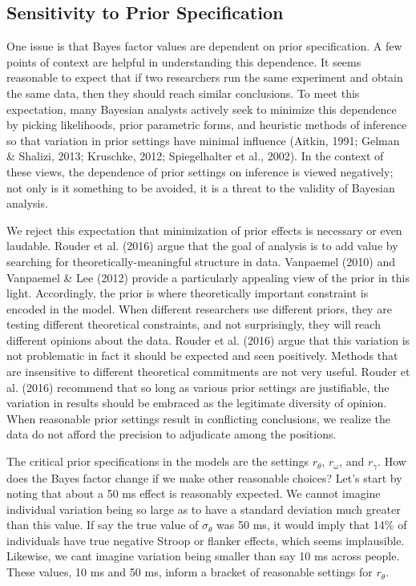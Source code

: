 \documentclass[english,man]{apa6}
\theoremstyle{definition}
\theoremstyle{definition}
\theoremstyle{remark}
\begin{document}
\subsection{Sensitivity to Prior
Specification}\label{sensitivity-to-prior-specification}

One issue is that Bayes factor values are dependent on prior
specification. A few points of context are helpful in understanding this
dependence. It seems reasonable to expect that if two researchers run
the same experiment and obtain the same data, then they should reach
similar conclusions. To meet this expectation, many Bayesian analysts
actively seek to minimize this dependence by picking likelihoods, prior
parametric forms, and heuristic methods of inference so that variation
in prior settings have minimal influence (Aitkin, 1991; Gelman \&
Shalizi, 2013; Kruschke, 2012; Spiegelhalter et al., 2002). In the
context of these views, the dependence of prior settings on inference is
viewed negatively; not only is it something to be avoided, it is a
threat to the validity of Bayesian analysis.

We reject this expectation that minimization of prior effects is
necessary or even laudable. Rouder et al. (2016) argue that the goal of
analysis is to add value by searching for theoretically-meaningful
structure in data. Vanpaemel (2010) and Vanpaemel \& Lee (2012) provide
a particularly appealing view of the prior in this light. Accordingly,
the prior is where theoretically important constraint is encoded in the
model. When different researchers use different priors, they are testing
different theoretical constraints, and not surprisingly, they will reach
different opinions about the data. Rouder et al. (2016) argue that this
variation is not problematic in fact it should be expected and seen
positively. Methods that are insensitive to different theoretical
commitments are not very useful. Rouder et al. (2016) recommend that so
long as various prior settings are justifiable, the variation in results
should be embraced as the legitimate diversity of opinion. When
reasonable prior settings result in conflicting conclusions, we realize
the data do not afford the precision to adjudicate among the positions.

The critical prior specifications in the models are the settings
\(r_\theta\), \(r_\omega\), and \(r_\gamma\). How does the Bayes factor
change if we make other reasonable choices? Let's start by noting that
about a 50 ms effect is reasonably expected. We cannot imagine
individual variation being so large as to have a standard deviation much
greater than this value. If say the true value of \(\sigma_\theta\) was
50 ms, it would imply that 14\% of individuals have true negative Stroop
or flanker effects, which seems implausible. Likewise, we cant imagine
variation being smaller than say 10 ms across people. These values, 10
ms and 50 ms, inform a bracket of reasonable settings for \(r_\theta\).
\end{document}
